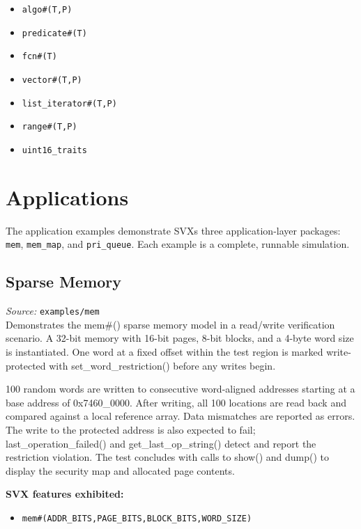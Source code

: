 \documentclass[11pt,letterpaper]{report}
\begin{document}
\begin{itemize}
  \item \texttt{algo\#(T,P)}
  \item \texttt{predicate\#(T)}
  \item \texttt{fcn\#(T)}
  \item \texttt{vector\#(T,P)}
  \item \texttt{list\_iterator\#(T,P)}
  \item \texttt{range\#(T,P)}
  \item \texttt{uint16\_traits}
\end{itemize}
\chapter{Applications}

The application examples demonstrate SVX\textquotesingle s three application-layer packages: \texttt{mem}, \texttt{mem\_map}, and \texttt{pri\_queue}. Each example is a complete, runnable simulation.

\section{Sparse Memory}

\textit{Source:} \texttt{examples/mem}\\

Demonstrates the mem\#() sparse memory model in a read/write verification scenario. A 32-bit memory with 16-bit pages, 8-bit blocks, and a 4-byte word size is instantiated. One word at a fixed offset within the test region is marked write-protected with set\_word\_restriction() before any writes begin.

100 random words are written to consecutive word-aligned addresses starting at a base address of 0x7460\_0000. After writing, all 100 locations are read back and compared against a local reference array. Data mismatches are reported as errors. The write to the protected address is also expected to fail; last\_operation\_failed() and get\_last\_op\_string() detect and report the restriction violation. The test concludes with calls to show() and dump() to display the security map and allocated page contents.

\textbf{SVX features exhibited:}

\begin{itemize}
  \item \texttt{mem\#(ADDR\_BITS,PAGE\_BITS,BLOCK\_BITS,WORD\_SIZE)}
\end{itemize}
\end{document}
